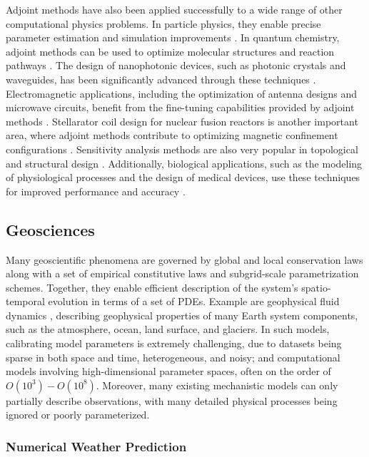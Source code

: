 Adjoint methods have also been applied successfully to a wide range of other computational physics problems. 
In particle physics, they enable precise parameter estimation and simulation improvements \cite{Dorigo.2022}.
In quantum chemistry, adjoint methods can be used to optimize molecular structures and reaction pathways \cite{Arrazola.2021}. 
The design of nanophotonic devices, such as photonic crystals and waveguides, has been significantly advanced through these techniques \cite{Molesky_Lin_Piggott_Jin_Vucković_Rodriguez_2018}. 
Electromagnetic applications, including the optimization of antenna designs and microwave circuits, benefit from the fine-tuning capabilities provided by adjoint methods \cite{Georgieva_Glavic_Bakr_Bandler_2002}. 
Stellarator coil design for nuclear fusion reactors is another important area, where adjoint methods contribute to optimizing magnetic confinement configurations \cite{McGreivy_stellarator_2021}.
Sensitivity analysis methods are also very popular in topological and structural design \cite{min1999optimal, van2005review}.
Additionally, biological applications, such as the modeling of physiological processes and the design of medical devices, use these techniques for improved performance and accuracy \cite{Strouwen2022}.


\subsection{Geosciences}

Many geoscientific phenomena are governed by global and local conservation laws along with a set of empirical constitutive laws and subgrid-scale parametrization schemes. 
Together, they enable efficient description of the system's spatio-temporal evolution in terms of a set of PDEs.
Example are geophysical fluid dynamics \cite{Vallis:2016kv}, describing geophysical properties of many Earth system components, such as the atmosphere, ocean, land surface, and glaciers.
In such models, calibrating model parameters is extremely challenging, due to datasets being sparse in both space and time, heterogeneous, and noisy; and computational models involving high-dimensional parameter spaces, often on the order of $O(10^3) - O(10^8)$.
Moreover, many existing mechanistic models can only partially describe observations, with many detailed physical processes being ignored or poorly parameterized. 


\subsubsection{Numerical Weather Prediction}
\label{section:meteorlogy}

